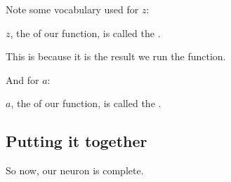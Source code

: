        Note some vocabulary used for $z$:\\
        
        \begin{notation}
            $z$, the  of our  function, is called the .
            
            This is because it is the result  we run the  function.
        \end{notation}
        
        And for $a$:\\

        \begin{notation}
            $a$, the  of our  function, is called the .
        \end{notation}
        
    \subsection{Putting it together}
    
        So now, our neuron is complete.\\

